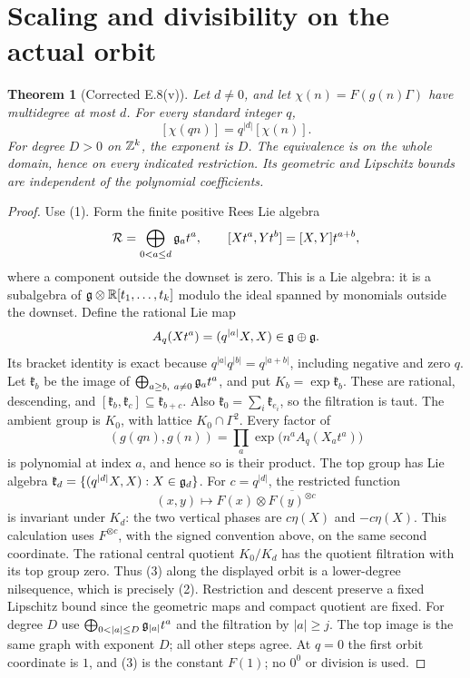 \documentclass[11pt]{article}
\newtheorem{theorem}{Theorem}
\newcommand{\R}{\mathbb R}\newcommand{\Q}{\mathbb Q}
\begin{document}
\section{Scaling and divisibility on the actual orbit}\label{sec:scale}
\begin{theorem}[Corrected E.8(v)]\label{thm:scale}
Let $d\ne0$, and let $\chi(n)=F(g(n)\Gamma)$ have multidegree at most $d$.
For every standard integer $q$,
\[
 [\chi(qn)]=q^{|d|}[\chi(n)] .                \tag{2}
\]
For degree $D>0$ on $\mathbb Z^k$, the exponent is $D$. The equivalence is on
the whole domain, hence on every indicated restriction. Its geometric
and Lipschitz bounds are independent of the polynomial coefficients.
\end{theorem}
\begin{proof}
Use (1). Form the finite positive Rees Lie algebra
\[
 \mathcal R=\bigoplus_{0<a\leq d}\mathfrak g_a t^a,
 \qquad[Xt^a,Yt^b]=[X,Y]t^{a+b},
\]
where a component outside the downset is zero. This is a Lie algebra:
it is a subalgebra of $\g\otimes\R[t_1,\ldots,t_k]$ modulo the ideal
spanned by monomials outside the downset. Define the rational Lie map
\[
 A_q(Xt^a)=(q^{|a|}X,X)\in\mathfrak g\oplus\mathfrak g.
\]
Its bracket identity is exact because
$q^{|a|}q^{|b|}=q^{|a+b|}$, including negative and zero $q$.
Let $\mathfrak k_b$ be the image of
$\bigoplus_{a\geq b,\ a\ne0}\g_a t^a$, and put $K_b=\exp\mathfrak k_b$.
These are rational, descending, and
$[\mathfrak k_b,\mathfrak k_c]\subseteq\mathfrak k_{b+c}$.
Also $\mathfrak k_0=\sum_i\mathfrak k_{e_i}$, so the filtration is taut.
The ambient group is $K_0$, with lattice $K_0\cap\Gamma^2$.
Every factor of
\[
 (g(qn),g(n))=\prod_a\exp\bigl(n^a A_q(X_a t^a)\bigr)
\]
is polynomial at index $a$, and hence so is their product. The top group
has Lie algebra
$\mathfrak k_d=\{(q^{|d|}X,X):X\in\mathfrak g_d\}$.
For $c=q^{|d|}$, the restricted function
\[
 (x,y)\longmapsto F(x)\otimes\overline{F(y)^{\otimes c}}
                                                        \tag{3}
\]
is invariant under $K_d$: the two vertical phases are $c\eta(X)$ and
$-c\eta(X)$. This calculation uses $F^{\otimes c}$, with the signed
convention above, on the same second coordinate. The rational central
quotient $K_0/K_d$ has the quotient filtration with its top group zero.
Thus (3) along the displayed orbit is a lower-degree nilsequence, which
is precisely (2). Restriction and descent preserve a fixed Lipschitz
bound since the geometric maps and compact quotient are fixed.
For degree $D$ use
$\bigoplus_{0<|a|\leq D}\g_{|a|}t^a$ and the filtration by $|a|\geq j$.
The top image is the same graph with exponent $D$; all other steps agree.
At $q=0$ the first orbit coordinate is $1$, and (3) is the constant
$F(1)$; no $0^0$ or division is used.
\end{proof}
\end{document}
